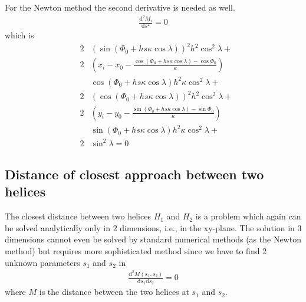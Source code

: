 \documentclass[twoside]{article}
\begin{document}
\begin{description}
For the Newton method the second derivative is needed as well.
\begin{eqnarray}
\frac{\mathrm{d}^2M_i}{\mathrm{d}s^2}  = 0
\end{eqnarray}
which is
\begin{eqnarray}
    &2&\left (\sin(\Phi_0+hs\kappa\cos\lambda)\right )^{2}{h}^{2}\cos^{2}\lambda + \nonumber \\
    &2&\left (x_i-{x_0}-{\frac {\cos(\Phi_0+hs\kappa\cos\lambda)-\cos\Phi_0}{\kappa}}\right ) \nonumber \\
    & &\cos(\Phi_0+hs\kappa\cos\lambda){h}^{2}\kappa \cos^{2}\lambda + \nonumber \\
    &2&\left (\cos(\Phi_0+hs\kappa\cos\lambda)\right )^{2}{h}^{2}\cos^{2}\lambda +  \nonumber \\
    &2&\left (y_i-{y_0}-{\frac {\sin(
                \Phi_0+hs\kappa\cos\lambda)-\sin\Phi_0}{\kappa}}\right ) \nonumber \\
    & &\sin(\Phi_0+hs\kappa\cos\lambda){h}^{2}\kappa
    \cos^{2}\lambda + \nonumber \\
    &2&\sin^2\lambda = 0 
\end{eqnarray}

\subsection{Distance of closest approach between two helices}
 The closest distance between two helices
$H_1$ and $H_2$ is a problem which again can be solved analytically
only in 2 dimensions, i.e., in the xy-plane.  The solution in 3
dimensions cannot even be solved by standard numerical methods (as the
Newton method) but requires more sophisticated method since we have to
find 2 unknown parameters $s_1$ and $s_2$ in
\begin{eqnarray}
\frac{\mathrm{d}^2 M(s_1, s_2)}{\mathrm{d} s_1 \mathrm{d} s_2} = 0
\end{eqnarray}
where $M$ is the distance between the two helices at $s_1$ and $s_2$.


\end{description}
\end{document}
